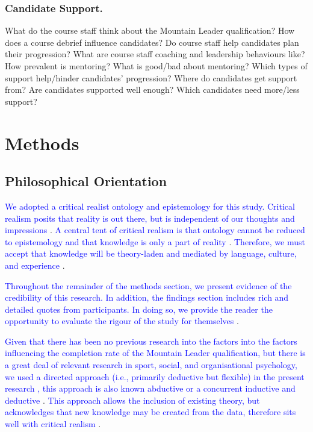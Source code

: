 \documentclass[
  12pt,
  a4paper,
]{book}
\begin{document}
\hypertarget{qual-research-questions-support}{%
\subsubsection{Candidate Support.}\label{qual-research-questions-support}}

What do the course staff think about the Mountain Leader qualification? How does a course debrief influence candidates? Do course staff help candidates plan their progression? What are course staff coaching and leadership behaviours like? How prevalent is mentoring? What is good/bad about mentoring? Which types of support help/hinder candidates' progression? Where do candidates get support from? Are candidates supported well enough? Which candidates need more/less support?

\hypertarget{methods}{%
\section{Methods}\label{methods}}

\hypertarget{philosophical-orientation}{%
\subsection{Philosophical Orientation}\label{philosophical-orientation}}

\textcolor{blue}{We adopted a critical realist ontology and epistemology for this study. Critical realism posits that reality is out there, but is independent of our thoughts and impressions} \citep{Bhaskar1998}. \textcolor{blue}{A central tent of critical realism is that ontology cannot be reduced to epistemology and that knowledge is only a part of reality} \citep{Bhaskar1998, Fletcher2017}. \textcolor{blue}{Therefore, we must accept that knowledge will be theory-laden and mediated by language, culture, and experience} \citep{Clarke2015, Houston2001, Philips1987, Ussher1999}.

\textcolor{blue}{Throughout the remainder of the methods section, we present evidence of the credibility of this research. In addition, the findings section includes rich and detailed quotes from participants. In doing so, we provide the reader the opportunity to evaluate the rigour of the study for themselves} \citep{Sparkes2009}.

\textcolor{blue}{Given that there has been no previous research into the factors into the factors influencing the completion rate of the Mountain Leader qualification, but there is a great deal of relevant research in sport, social, and organisational psychology, we used a directed approach (i.e., primarily deductive but flexible) in the present research} \citep[cf.~][]{Fletcher2017, Hsieh2005}\textcolor{blue}{, this approach is also known abductive or a concurrent inductive and deductive} \citep{Biddle2001, Patton2002, Webster2017}. \textcolor{blue}{This approach allows the inclusion of existing theory, but acknowledges that new knowledge may be created from the data, therefore sits well with critical realism} \citep{Fletcher2017}.
\end{document}

